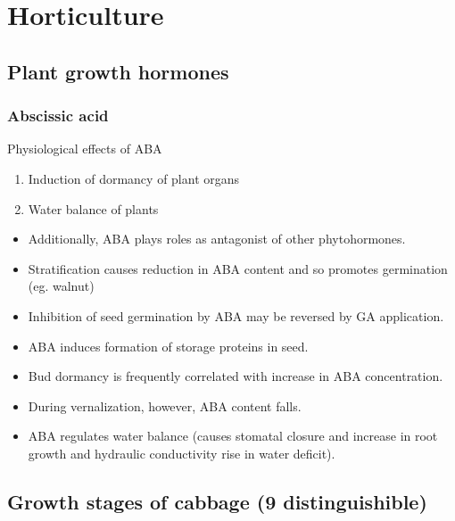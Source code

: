 \documentclass[
  openany]{book}
\providecommand{\tightlist}{%
  \setlength{\itemsep}{0pt}\setlength{\parskip}{0pt}}
\begin{document}
\hypertarget{horticulture}{%
\chapter{Horticulture}\label{horticulture}}

\hypertarget{plant-growth-hormones}{%
\section{Plant growth hormones}\label{plant-growth-hormones}}

\hypertarget{abscissic-acid}{%
\subsection{Abscissic acid}\label{abscissic-acid}}

Physiological effects of ABA

\begin{enumerate}
\def\labelenumi{\arabic{enumi}.}
\tightlist
\item
  Induction of dormancy of plant organs
\item
  Water balance of plants
\end{enumerate}

\begin{itemize}
\tightlist
\item
  Additionally, ABA plays roles as antagonist of other phytohormones.
\item
  Stratification causes reduction in ABA content and so promotes germination (eg. walnut)
\item
  Inhibition of seed germination by ABA may be reversed by GA application.
\item
  ABA induces formation of storage proteins in seed.
\item
  Bud dormancy is frequently correlated with increase in ABA concentration.
\item
  During vernalization, however, ABA content falls.
\item
  ABA regulates water balance (causes stomatal closure and increase in root growth and hydraulic conductivity rise in water deficit).
\end{itemize}

\hypertarget{growth-stages-of-cabbage-9-distinguishible}{%
\section{Growth stages of cabbage (9 distinguishible)}\label{growth-stages-of-cabbage-9-distinguishible}}
\end{document}
